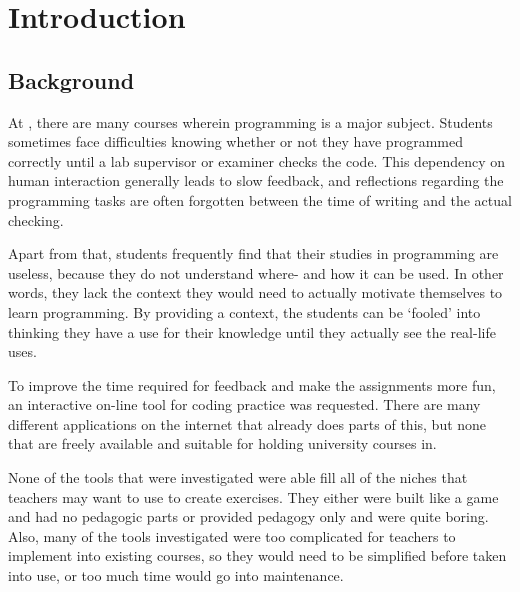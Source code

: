 \chapter{Introduction}
\section{Background} 
At \LTU, there are many courses wherein programming is a major subject. Students sometimes face difficulties knowing whether or not they have programmed correctly until a lab supervisor or examiner checks the code. This dependency on human interaction generally leads to slow feedback, and reflections regarding the programming tasks are often forgotten between the time of writing and the actual checking.

Apart from that, students frequently find that their studies in programming are useless, because they do not understand where- and how it can be used. In other words, they lack the context they would need to actually motivate themselves to learn programming. By providing a context, the students can be `fooled' into thinking they have a use for their knowledge until they actually see the real-life uses.

To improve the time required for feedback and make the assignments more fun, an interactive on-line tool for coding practice was requested. There are many different applications on the internet that already does parts of this, but none that are freely available and suitable for holding university courses in.

None of the tools that were investigated were able fill all of the niches that teachers may want to use to create exercises. They either were built like a game and had no pedagogic parts or provided pedagogy only and were quite boring. Also, many of the tools investigated were too complicated for teachers to implement into existing courses, so they would need to be simplified before taken into use, or too much time would go into maintenance.%



